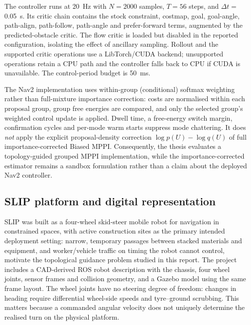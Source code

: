 \documentclass[journal]{IEEEtran}
\begin{document}
The controller runs at \SI{20}{Hz} with $N=2000$ samples, $T=56$ steps, and
$\Delta t={}$\SI{0.05}{s}. Its critic chain contains the stock constraint,
costmap, goal, goal-angle, path-align, path-follow, path-angle and
prefer-forward terms, augmented by the predicted-obstacle critic. The flow
critic is loaded but disabled in the reported configuration, isolating the
effect of ancillary sampling. Rollout and the supported critic operations use
a LibTorch/CUDA backend; unsupported operations retain a CPU path and the
controller falls back to CPU if CUDA is unavailable. The control-period budget
is \SI{50}{ms}.

The Nav2 implementation uses within-group (conditional) softmax weighting
rather than full-mixture importance correction: costs are normalised
within each proposal group, group free energies are compared, and only the
selected group's weighted control update is applied. Dwell time, a free-energy
switch margin, confirmation cycles and per-mode warm starts suppress mode
chattering. It does \emph{not} apply the explicit proposal-density correction
$\log p(U)-\log q(U)$ of full importance-corrected Biased MPPI. Consequently,
the thesis evaluates a topology-guided grouped MPPI implementation, while the
importance-corrected estimator remains a sandbox formulation rather than a
claim about the deployed Nav2 controller.

\subsection{SLIP platform and digital representation}
\label{sec:slip-platform}
SLIP was built as a four-wheel skid-steer mobile robot for navigation in
constrained spaces, with active construction sites as the primary intended
deployment setting: narrow, temporary passages between stacked materials and
equipment, and worker/vehicle traffic on timing the robot cannot control,
motivate the topological guidance problem studied in this report. The project
includes a CAD-derived ROS robot description
with the chassis, four wheel joints, sensor frames and collision geometry, and
a Gazebo model using the same frame layout. The wheel joints have no steering
degree of freedom: changes in heading require differential wheel-side speeds
and tyre--ground scrubbing. This matters because a commanded angular velocity
does not uniquely determine the realised turn on the physical platform.
\end{document}
